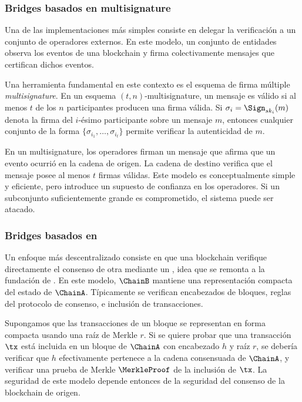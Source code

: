 \subsubsection{Bridges basados en multisignature}

Una de las implementaciones más simples consiste en delegar la verificación a un conjunto de operadores externos. En este modelo, un conjunto de entidades observa los eventos de una blockchain y firma colectivamente mensajes que certifican dichos eventos.

Una herramienta fundamental en este contexto es el esquema de firma múltiple \emph{multisignature}. En un esquema $(t,n)$-multisignature, un mensaje es válido si al menos $t$ de los $n$ participantes producen una firma válida. Si $\sigma_i = \Sign_{sk_i}(m)$ denota la firma del $i$-ésimo participante sobre un mensaje $m$, entonces cualquier conjunto de la forma $\{\sigma_{i_1}, \ldots, \sigma_{i_t}\}$ permite verificar la autenticidad de $m$.

En un \Bridge multisignature, los operadores firman un mensaje que afirma que un evento ocurrió en la cadena de origen. La cadena de destino verifica que el mensaje posee al menos $t$ firmas válidas. Este modelo es conceptualmente simple y eficiente, pero introduce un supuesto de confianza en los operadores. Si un subconjunto suficientemente grande es comprometido, el sistema puede ser atacado.

\subsubsection{Bridges basados en \LightClients}

Un enfoque más descentralizado consiste en que una blockchain verifique directamente el consenso de otra mediante un \emph{\LightClient}, idea que se remonta a la fundación de \Bitcoin \cite{nakamoto2009bitcoin}. En este modelo, $\ChainB$ mantiene una representación compacta del estado de $\ChainA$. Típicamente se verifican encabezados de bloques, reglas del protocolo de consenso, e inclusión de transacciones.

Supongamos que las transacciones de un bloque se representan en forma compacta usando una raíz de Merkle $r$. Si se quiere probar que una transacción $\tx$ está incluida en un bloque de $\ChainA$ con encabezado $h$ y raíz $r$, se debería verificar que $h$ efectivamente pertenece a la cadena consensuada de $\ChainA$, y verificar una prueba de Merkle $\MerkleProof$ de la inclusión de $\tx$. La seguridad de este modelo depende entonces de la seguridad del consenso de la blockchain de origen.

